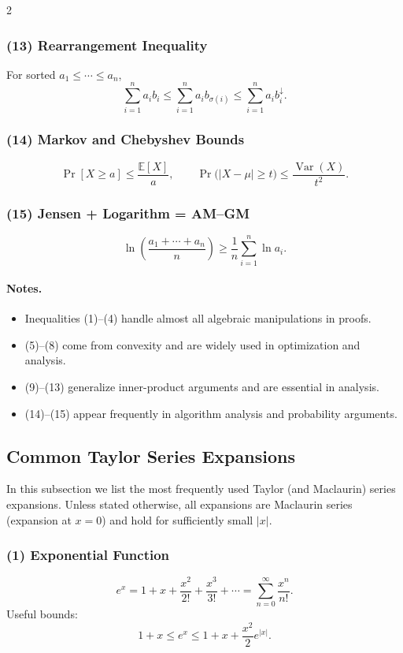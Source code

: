 \documentclass[10pt]{article}
\theoremstyle{definition}
\begin{document}
\begin{multicols*}{2}
\subsubsection*{(13) Rearrangement Inequality}
For sorted \(a_1 \le \cdots \le a_n\),
\[
\sum_{i=1}^n a_i b_i
\le
\sum_{i=1}^n a_i b_{\sigma(i)}
\le
\sum_{i=1}^n a_i b_i^{\downarrow}.
\]

\subsubsection*{(14) Markov and Chebyshev Bounds}
\[
\Pr[X\ge a] \le \frac{\mathbb{E}[X]}{a},
\qquad
\Pr\big(|X-\mu|\ge t\big)\le \frac{\operatorname{Var}(X)}{t^2}.
\]

\subsubsection*{(15) Jensen + Logarithm = AM--GM}
\[
\ln\!\left(\frac{a_1+\cdots+a_n}{n}\right)
\ge
\frac{1}{n}\sum_{i=1}^n \ln a_i.
\]

\paragraph{Notes.}
\begin{itemize}
    \item Inequalities (1)--(4) handle almost all algebraic manipulations in proofs.
    \item (5)--(8) come from convexity and are widely used in optimization and analysis.
    \item (9)--(13) generalize inner-product arguments and are essential in analysis.
    \item (14)--(15) appear frequently in algorithm analysis and probability arguments.
\end{itemize}
\subsection{Common Taylor Series Expansions}

In this subsection we list the most frequently used Taylor (and Maclaurin)
series expansions.  Unless stated otherwise, all expansions are Maclaurin
series (expansion at \(x=0\)) and hold for sufficiently small \(|x|\).

\subsubsection*{(1) Exponential Function}
\[
e^x
    = 1 + x + \frac{x^2}{2!} + \frac{x^3}{3!} + \cdots
    = \sum_{n=0}^\infty \frac{x^n}{n!}.
\]
Useful bounds:
\[
1+x \le e^x \le 1 + x + \frac{x^2}{2}e^{|x|}.
\]


\end{multicols*}
\end{document}

